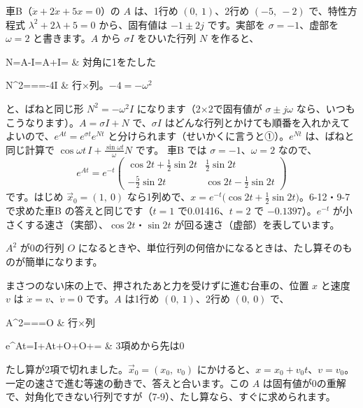 車B（$\ddot x+2\dot x+5x=0$）の $A$ は、1行め $(0,\ 1)$、2行め $(-5,\ -2)$ で、特性方程式 $\lambda^2+2\lambda+5=0$ から、固有値は $-1\pm2j$ です。実部を $\sigma=-1$、虚部を $\omega=2$ と書きます。$A$ から $\sigma I$ をひいた行列 $N$ を作ると、
\begin{bkhenkei}[0.52]
N=A-\sigma I=A+I= & 対角に1をたした \\
\end{bkhenkei}
\begin{bkhenkei}[0.7]
N^2===-4I & 行×列。$-4=-\omega^2$ \\
\end{bkhenkei}
と、ばねと同じ形 $N^2=-\omega^2I$ になります（2×2で固有値が $\sigma\pm j\omega$ なら、いつもこうなります）。$A=\sigma I+N$ で、$\sigma I$ はどんな行列とかけても順番を入れかえてよいので、$e^{At}=e^{\sigma t}e^{Nt}$ と分けられます（せいかくに言うと①）。$e^{Nt}$ は、ばねと同じ計算で $\cos\omega t\,I+\frac{\sin\omega t}{\omega}N$ です。
車B では $\sigma=-1$、$\omega=2$ なので、
\[ e^{At}=e^{-t}\begin{pmatrix}\cos2t+\frac12\sin2t&\frac12\sin2t\\[2pt]-\frac52\sin2t&\cos2t-\frac12\sin2t\end{pmatrix} \]
です。はじめ $\vec x_0=(1,\ 0)$ なら1列めで、$x=e^{-t}\bigl(\cos2t+\frac12\sin2t\bigr)$。6-12・9-7 で求めた車B の答えと同じです（$t=1$ で0.01416、$t=2$ で $-0.1397$）。$e^{-t}$ が小さくする速さ（実部）、$\cos2t$・$\sin2t$ が回る速さ（虚部）を表しています。


\label{bk:9-11:kireru}$A^2$ が0の行列 $O$ になるときや、単位行列の何倍かになるときは、たし算そのものが簡単になります。

まさつのない床の上で、押されたあと力を受けずに進む台車の、位置 $x$ と速度 $v$ は $\dot x=v$、$\dot v=0$ です。$A$ は1行め $(0,\ 1)$、2行め $(0,\ 0)$ で、
\begin{bkhenkei}[0.7]
A^2===O & 行×列 \\
\end{bkhenkei}
\begin{bkhenkei}[0.66]
e^{At}=I+At+O+O+\cdots= & 3項めから先は0 \\
\end{bkhenkei}
たし算が2項で切れました。$\vec x_0=(x_0,\ v_0)$ にかけると、$x=x_0+v_0t$、$v=v_0$。一定の速さで進む等速の動きで、答えと合います。この $A$ は固有値が0の重解で、対角化できない行列ですが（7-9）、たし算なら、すぐに求められます。

